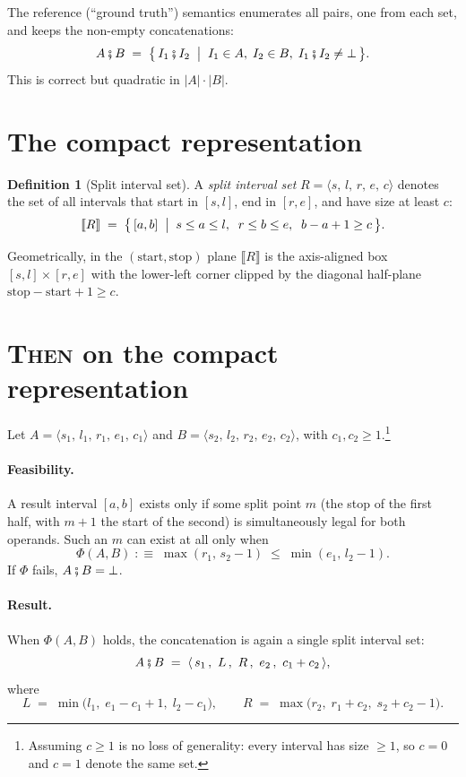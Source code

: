 \documentclass[11pt]{article}
\newcommand{\sem}[1]{\llbracket #1 \rrbracket}      %
\newcommand{\Then}{\mathbin{\fatsemi}}              %
\newcommand{\Empty}{\bot}                           %
\newcommand{\size}[1]{\lvert #1 \rvert}
\newcommand{\R}[5]{\langle #1,\, #2,\, #3,\, #4,\, #5 \rangle} %
\theoremstyle{definition}
\newtheorem{definition}{Definition}
\theoremstyle{plain}
\begin{document}
The reference (``ground truth'') semantics enumerates all pairs, one from each
set, and keeps the non-empty concatenations:
\[
  A \Then B \;=\;
  \bigl\{\, I_1 \Then I_2 \;\bigm|\; I_1 \in A,\; I_2 \in B,\;
            I_1 \Then I_2 \neq \Empty \,\bigr\}.
\]
This is correct but quadratic in $\size{A}\cdot\size{B}$.

\section{The compact representation}

\begin{definition}[Split interval set]
A \emph{split interval set} $R = \R{s}{l}{r}{e}{c}$ denotes the set of all
intervals that start in $[s, l]$, end in $[r, e]$, and have size at least $c$:
\[
  \sem{R} \;=\;
  \bigl\{\, [a, b] \;\bigm|\;
            s \le a \le l,\;\;
            r \le b \le e,\;\;
            b - a + 1 \ge c \,\bigr\}.
\]
\end{definition}

\noindent
Geometrically, in the $(\text{start},\text{stop})$ plane $\sem{R}$ is the
axis-aligned box $[s, l] \times [r, e]$ with the lower-left corner clipped by
the diagonal half-plane $\text{stop} - \text{start} + 1 \ge c$.

\section{\textsc{Then} on the compact representation}

Let $A = \R{s_1}{l_1}{r_1}{e_1}{c_1}$ and $B = \R{s_2}{l_2}{r_2}{e_2}{c_2}$,
with $c_1, c_2 \ge 1$.\footnote{Assuming $c \ge 1$ is no loss of generality:
every interval has size $\ge 1$, so $c = 0$ and $c = 1$ denote the same set.}

\paragraph{Feasibility.}
A result interval $[a,b]$ exists only if some split point $m$ (the stop of the
first half, with $m+1$ the start of the second) is simultaneously legal for
both operands. Such an $m$ can exist at all only when
\[
  \Phi(A, B)\;:\equiv\;
  \max(r_1,\, s_2 - 1)\;\le\;\min(e_1,\, l_2 - 1).
\]
If $\Phi$ fails, $A \Then B = \Empty$.

\paragraph{Result.}
When $\Phi(A,B)$ holds, the concatenation is again a single split interval set:
\[
  A \Then B \;=\; \R{\,s_1\,}{\,L\,}{\,R\,}{\,e_2\,}{\,c_1 + c_2\,},
\]
where
\[
  L \;=\; \min\!\bigl(l_1,\; e_1 - c_1 + 1,\; l_2 - c_1\bigr),
  \qquad
  R \;=\; \max\!\bigl(r_2,\; r_1 + c_2,\; s_2 + c_2 - 1\bigr).
\]
\end{document}
